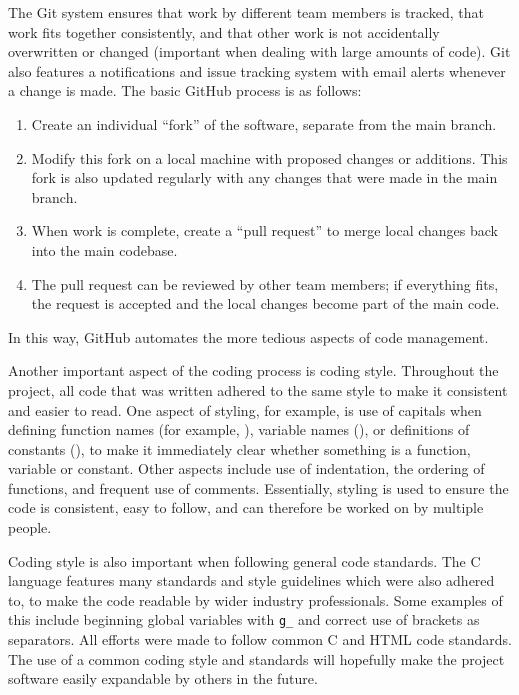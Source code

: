 The Git system ensures that work by different team members is tracked\cite{github_contribs}, that work fits together consistently, and that other work is not accidentally overwritten or changed (important when dealing with large amounts of code). Git also features a notifications and issue tracking system with email alerts whenever a change is made. The basic GitHub process is as follows:

\begin{enumerate}
	\item Create an individual ``fork'' of the software, separate from the main branch.
	\item Modify this fork on a local machine with proposed changes or additions. This fork is also updated regularly with any changes that were made in the main branch.
	\item When work is complete, create a ``pull request'' to merge local changes back into the main codebase.
	\item The pull request can be reviewed by other team members; if everything fits, the request is accepted and the local changes become part of the main code. 
\end{enumerate}
In this way, GitHub automates the more tedious aspects of code management.

Another important aspect of the coding process is coding style. Throughout the project, all code that was written adhered to the same style to make it consistent and easier to read. One aspect of styling, for example, is use of capitals when defining function names (for example, ), variable names (), or definitions of constants (), to make it immediately clear whether something is a function, variable or constant. Other aspects include use of indentation, the ordering of functions, and frequent use of comments. Essentially, styling is used to ensure the code is consistent, easy to follow, and can therefore be worked on by multiple people. 

Coding style is also important when following general code standards. The C language features many standards and style guidelines which were also adhered to, to make the code readable by wider industry professionals. Some examples of this include beginning global variables with \texttt{g_} and correct use of brackets as separators\cite{mellon}. All efforts were made to follow common C and HTML code standards. The use of a common coding style and standards will hopefully make the project software easily expandable by others in the future.


